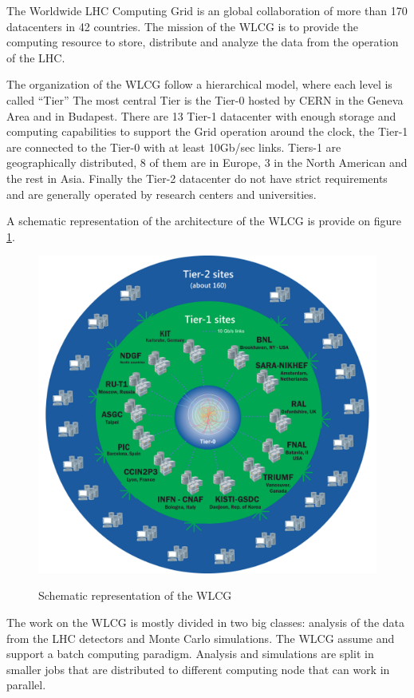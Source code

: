 The Worldwide LHC Computing Grid is an global collaboration of more than 170
datacenters in 42 countries.  The mission of the WLCG is to provide the
computing resource to store, distribute and analyze the data from the operation
of the LHC.

The organization of the WLCG follow a hierarchical model, where each level is
called “Tier” The most central Tier is the Tier-0 hosted by CERN in the Geneva
Area and in Budapest. There are 13 Tier-1 datacenter with enough storage and
computing capabilities to support the Grid operation around the clock, the
Tier-1 are connected to the Tier-0 with at least 10Gb/sec links.  Tiers-1 are
geographically distributed, 8 of them are in Europe, 3 in the North American
and the rest in Asia. Finally the Tier-2 datacenter do not have strict
requirements and are generally operated by research centers and universities.

A schematic representation of the architecture of the WLCG is provide on figure
\ref{fig:WLCG-schema}.

\begin{figure}
\includegraphics{gfx/WLCG}
\label{fig:WLCG-schema}
\caption{Schematic representation of the WLCG}
\end{figure}


The work on the WLCG is mostly divided in two big classes: analysis of the data
from the LHC detectors and Monte Carlo simulations.  The WLCG assume and
support a batch computing paradigm. Analysis and simulations are split in
smaller jobs that are distributed to different computing node that can work in
parallel.

